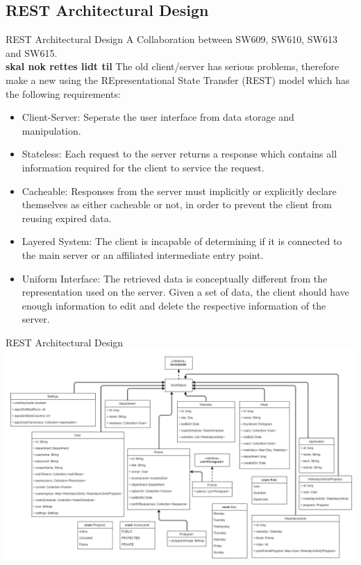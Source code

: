 \subsection{REST Architectural Design}
\begin{frame}{REST Architectural Design}
A Collaboration between SW609, SW610, SW613 and SW615.\\

\textbf{skal nok rettes lidt til}
The old client/server has serious problems, therefore make a new using the REpresentational State Transfer (REST) model which has the following requirements:
\begin{itemize}
\item Client-Server: Seperate the user interface from data storage and manipulation.
\item Stateless: Each request to the server returns a response which contains all information required for the client to service the request.
\item Cacheable: Responses from the server must implicitly or explicitly declare themselves as either cacheable or not, in order to prevent the client from reusing expired data.
\item Layered System: The client is incapable of determining if it is connected to the main server or an affiliated intermediate entry point.
\item Uniform Interface: The retrieved data is conceptually different from the representation used on the server. Given a set of data, the client should have enough information to edit and delete the respective information of the server.
\end{itemize}
\end{frame}

\begin{frame}{REST Architectural Design}
\includegraphics[scale=0.5]{figures/Giraf_RestModelV3.PNG}
\end{frame}

